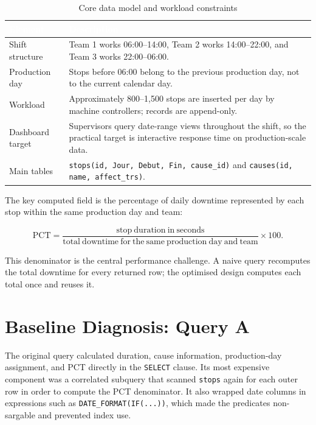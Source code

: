 \begin{table}[H]
\centering
\small
\caption{Core data model and workload constraints}
\label{tab:chapter3-1}
\setlength{\extrarowheight}{2pt}
\begin{tabular}{@{}>{\raggedright\arraybackslash}p{3.2cm}>{\raggedright\arraybackslash}p{10.8cm}@{}}
    \toprule
    \rowcolor[HTML]{1A5490}
    \textcolor{white}{\textbf{Element}} & \textcolor{white}{\textbf{Description}} \\
    \midrule
    \rowcolor[HTML]{E8F4F8}
    Shift structure & Team 1 works 06:00--14:00, Team 2 works 14:00--22:00, and Team 3 works 22:00--06:00. \\
    \rowcolor[HTML]{FFFFFF}
    Production day & Stops before 06:00 belong to the previous production day, not to the current calendar day. \\
    \rowcolor[HTML]{E8F4F8}
    Workload & Approximately 800--1,500 stops are inserted per day by machine controllers; records are append-only. \\
    \rowcolor[HTML]{FFFFFF}
    Dashboard target & Supervisors query date-range views throughout the shift, so the practical target is interactive response time on production-scale data. \\
    \rowcolor[HTML]{E8F4F8}
    Main tables & \texttt{stops(id, Jour, Debut, Fin, cause\_id)} and \texttt{causes(id, name, affect\_trs)}. \\
    \bottomrule
\end{tabular}
\end{table}

The key computed field is the percentage of daily downtime represented by each stop within the same production day and team:

\begin{equation}
\mathrm{PCT} = \frac{\mathrm{stop\ duration\ in\ seconds}}{\mathrm{total\ downtime\ for\ the\ same\ production\ day\ and\ team}} \times 100.
\end{equation}

This denominator is the central performance challenge. A naive query recomputes the total downtime for every returned row; the optimised design computes each total once and reuses it.

\section{Baseline Diagnosis: Query A}

The original query calculated duration, cause information, production-day assignment, and PCT directly in the \texttt{SELECT} clause. Its most expensive component was a correlated subquery that scanned \texttt{stops} again for each outer row in order to compute the PCT denominator. It also wrapped date columns in expressions such as \texttt{DATE\_FORMAT(IF(...))}, which made the predicates non-sargable and prevented index use.


